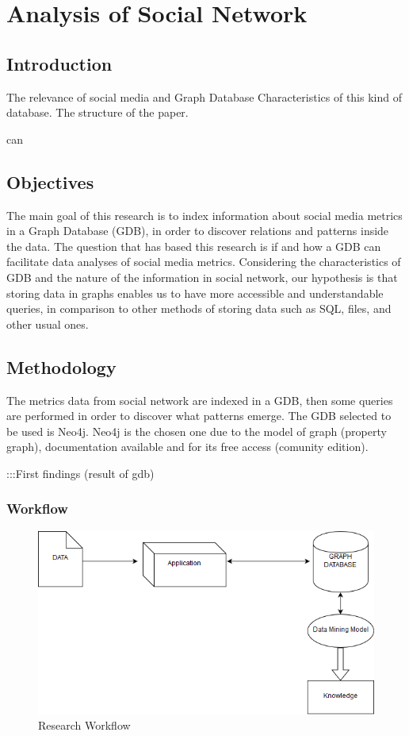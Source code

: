 \section{Analysis of Social Network}\label{analysis-of-social-network}

\subsection{Introduction}
The relevance of social media and Graph Database
Characteristics of this kind of database.
The structure of the paper.

can 
\subsection{Objectives}\label{objectives}

The main goal of this research is to index information about social media metrics in a Graph Database (GDB), in order to discover relations and patterns inside the data. The question that has based this research is if and how a GDB can facilitate data analyses of social media metrics. Considering the 
characteristics of GDB and the nature of the information in social network, our hypothesis is that storing data in graphs enables us to have more accessible and understandable queries, in comparison to other methods of storing data such as SQL, files, and other usual ones.

\subsection{Methodology}

The metrics data from social network are indexed in a GDB, then some queries are performed in order to discover what patterns emerge. The GDB selected to be used is Neo4j\cite{}. Neo4j is the chosen one due to the model of graph (property graph), documentation available and for its free access (comunity edition). 

:::First findings (result of gdb)

\subsubsection{Workflow}\label{workflow}

\begin{figure}
\centering
\includegraphics{../figures/research.png}
\caption{Research Workflow}
\end{figure}

